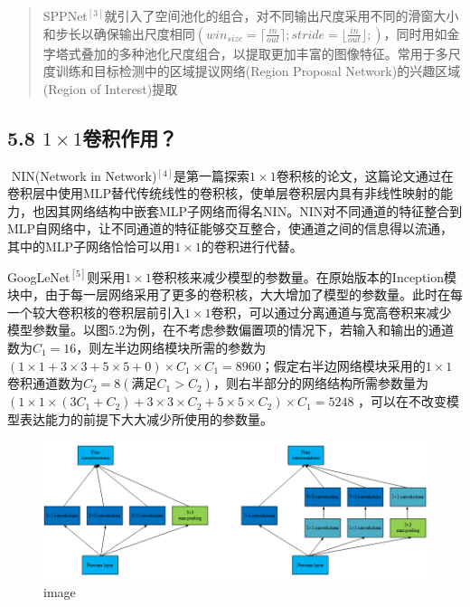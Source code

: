 \begin{quote}
SPPNet\(^{[3]}\)就引入了空间池化的组合，对不同输出尺度采用不同的滑窗大小和步长以确保输出尺度相同\((win_{size}=\lceil \frac{in}{out}\rceil; stride=\lfloor \frac{in}{out}\rfloor; )\)，同时用如金字塔式叠加的多种池化尺度组合，以提取更加丰富的图像特征。常用于多尺度训练和目标检测中的区域提议网络(Region
Proposal Network)的兴趣区域(Region of Interest)提取
\end{quote}

\subsection{\texorpdfstring{5.8
\(1\times1\)卷积作用？}{5.8 1\textbackslash{}times1卷积作用？}}\label{times1ux5377ux79efux4f5cux7528}

​ NIN(Network in
Network)\(^{[4]}​\)是第一篇探索\(1\times1​\)卷积核的论文，这篇论文通过在卷积层中使用MLP替代传统线性的卷积核，使单层卷积层内具有非线性映射的能力，也因其网络结构中嵌套MLP子网络而得名NIN。NIN对不同通道的特征整合到MLP自网络中，让不同通道的特征能够交互整合，使通道之间的信息得以流通，其中的MLP子网络恰恰可以用\(1\times1​\)的卷积进行代替。

​
GoogLeNet\(^{[5]}​\)则采用\(1\times1​\)卷积核来减少模型的参数量。在原始版本的Inception模块中，由于每一层网络采用了更多的卷积核，大大增加了模型的参数量。此时在每一个较大卷积核的卷积层前引入\(1\times1​\)卷积，可以通过分离通道与宽高卷积来减少模型参数量。以图5.2为例，在不考虑参数偏置项的情况下，若输入和输出的通道数为\(C_1=16​\)，则左半边网络模块所需的参数为\((1\times1+3\times3+5\times5+0)\times C_1\times C_1=8960​\)；假定右半边网络模块采用的\(1\times1​\)卷积通道数为\(C_2=8​\)\((满足C_1>C_2)​\)，则右半部分的网络结构所需参数量为\((1\times1\times (3C_1+C_2)+3\times3\times C_2 +5\times5\times C_2)\times C_1=5248​\)
，可以在不改变模型表达能力的前提下大大减少所使用的参数量。

\begin{figure}
\centering
\includegraphics{./img/ch5/5.8-1.png}
\caption{image}
\end{figure}


